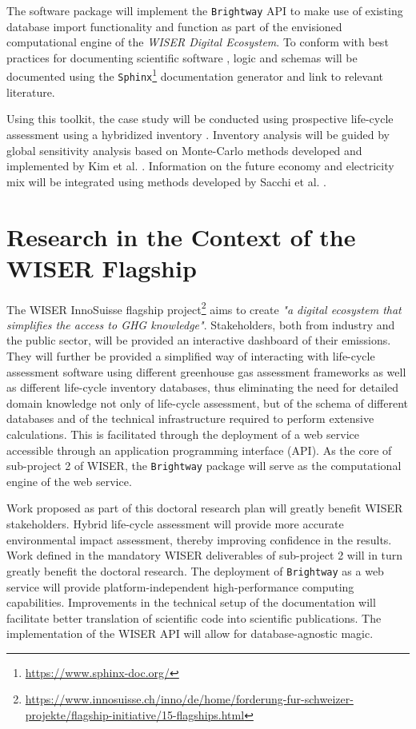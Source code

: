 \documentclass{article}
\begin{document}
    The software package will implement the \texttt{Brightway} API to make use of existing database import functionality and function as part of the envisioned computational engine of the \textit{WISER Digital Ecosystem}. To conform with best practices for documenting scientific software \cite{lee_ten_2018}, logic and schemas will be documented using the \texttt{Sphinx}\footnote{\url{https://www.sphinx-doc.org/}} documentation generator and link to relevant literature.
    
    Using this toolkit, the case study will be conducted using prospective \cite{sacchi_prospective_2022} life-cycle assessment using a hybridized inventory \cite{crawford_hybrid_2018}. Inventory analysis will be guided by global sensitivity analysis based on Monte-Carlo methods developed and implemented by Kim et al. \cite{kim_global_2022}. Information on the future economy and electricity mix will be integrated using methods developed by Sacchi et al. \cite{sacchi_prospective_2022}.
    
\section{Research in the Context of the WISER Flagship}
    
    The WISER InnoSuisse flagship project\footnote{\url{https://www.innosuisse.ch/inno/de/home/forderung-fur-schweizer-projekte/flagship-initiative/15-flagships.html}} aims to create \textit{"a digital ecosystem that simplifies the access to GHG knowledge"}. Stakeholders, both from industry and the public sector, will be provided an interactive dashboard of their emissions. They will further be provided a simplified way of interacting with life-cycle assessment software using different greenhouse gas assessment frameworks as well as different life-cycle inventory databases, thus eliminating the need for detailed domain knowledge not only of life-cycle assessment, but of the schema of different databases and of the technical infrastructure required to perform extensive calculations. This is facilitated through the deployment of a web service accessible through an application programming interface (API). As the core of sub-project 2 of WISER, the \texttt{Brightway} package will serve as the computational engine of the web service.
    
    Work proposed as part of this doctoral research plan will greatly benefit WISER stakeholders. Hybrid life-cycle assessment will provide more accurate environmental impact assessment, thereby improving confidence in the results. Work defined in the mandatory WISER deliverables of sub-project 2 will in turn greatly benefit the doctoral research. The deployment of \texttt{Brightway} as a web service will provide platform-independent high-performance computing capabilities. Improvements in the technical setup of the documentation will facilitate better translation of scientific code into scientific publications. The implementation of the WISER API will allow for database-agnostic magic.
    
\end{document}
